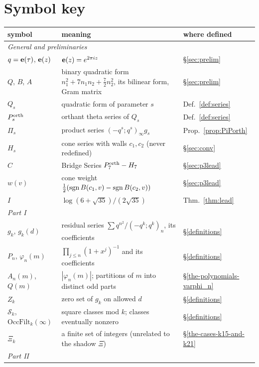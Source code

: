 \section*{Symbol key}
\begin{center}\small
\begin{longtable}{p{3.2cm}p{9.3cm}p{2.4cm}}\toprule
symbol & meaning & where defined\\\midrule\endhead
\multicolumn{3}{l}{\emph{General and preliminaries}}\\
$q=\mathbf{e}(\tau)$, $\mathbf{e}(z)$ & $\mathbf{e}(z)=e^{2\pi iz}$ & \S\ref{sec:prelim}\\
$Q$, $B$, $A$ & binary quadratic form $n_1^2+7n_1n_2+\frac72n_2^2$, its bilinear form, Gram matrix & \S\ref{sec:prelim}\\
$Q_s$ & quadratic form of parameter $s$ & Def.~\ref{def:series}\\
$P^{\mathrm{orth}}_s$ & orthant theta series of $Q_s$ & Def.~\ref{def:series}\\
$\Pi_s$ & product series $(-q^s;q^s)_\infty g_s$ & Prop.~\ref{prop:PiPorth}\\
$H_s$ & cone series with walls $c_1,c_2$ (never redefined) & \S\ref{sec:conv}\\
$C$ & Bridge Series $P^{\mathrm{orth}}_7-H_7$ & \S\ref{sec:p3lead}\\
$w(v)$ & cone weight $\frac12(\operatorname{sgn} B(c_1,v)-\operatorname{sgn} B(c_2,v))$ & \S\ref{sec:p3lead}\\
$I$ & $\log(6+\sqrt{35})/(2\sqrt{35})$ & Thm.~\ref{thm:lead}\\
\multicolumn{3}{l}{\emph{Part I}}\\
$g_k$, $g_k(d)$ & residual series $\sum q^{n^2}/(-q^k;q^k)_n$, its coefficients & \S\ref{definitions}\\
$P_n$, $\varphi_n(m)$ & $\prod_{j\le n}(1+x^j)^{-1}$ and its coefficients & \S\ref{definitions}\\
$A_n(m)$, $Q(m)$ & $|\varphi_n(m)|$; partitions of $m$ into distinct odd parts & \S\ref{the-polynomials-varphi_n}\\
$Z_k$ & zero set of $g_k$ on allowed $d$ & \S\ref{definitions}\\
$\mathcal S_k$, $\mathrm{OccFilt}_k(\infty)$ & square classes mod $k$; classes eventually nonzero & \S\ref{definitions}\\
$\Xi_k$ & a finite set of integers (unrelated to the shadow $\Xi$) & \S\ref{the-cases-k15-and-k21}\\
\multicolumn{3}{l}{\emph{Part II}}\\

\end{longtable}
\end{center}

